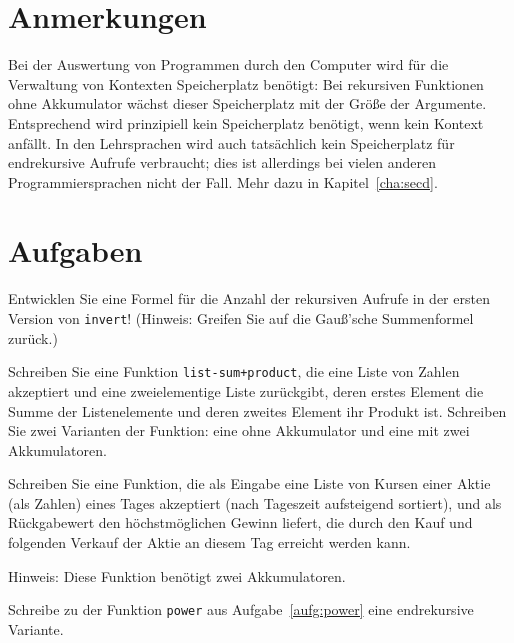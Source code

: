\section*{Anmerkungen}

Bei der Auswertung von Programmen durch den Computer wird für die
Verwaltung von Kontexten Speicherplatz benötigt: Bei rekursiven
Funktionen ohne Akkumulator wächst dieser Speicherplatz mit der Größe
der Argumente.  Entsprechend wird prinzipiell kein Speicherplatz
benötigt, wenn kein Kontext anfällt.  In den Lehrsprachen  wird auch tatsächlich
kein Speicherplatz für endrekursive Aufrufe verbraucht; dies ist
allerdings bei vielen anderen Programmiersprachen nicht der Fall.
Mehr dazu in Kapitel~\ref{cha:secd}.

\section*{Aufgaben}

\begin{aufgabe}
  \label{ref:o-of-invert}
  Entwicklen Sie eine Formel für die Anzahl der rekursiven Aufrufe in
  der ersten Version von \texttt{invert}!  (Hinweis: Greifen Sie auf
  die Gauß'sche Summenformel zurück.)
\end{aufgabe}

\begin{aufgabe}
  Schreiben Sie eine Funktion \texttt{list-sum+product}, die eine
  Liste von Zahlen akzeptiert und eine zweielementige Liste
  zurückgibt, deren erstes Element die Summe der Listenelemente und
  deren zweites Element ihr Produkt ist.  Schreiben Sie zwei Varianten
  der Funktion: eine ohne Akkumulator und eine mit zwei Akkumulatoren.
\end{aufgabe}

\begin{aufgabe}
  Schreiben Sie eine Funktion, die als Eingabe eine Liste von Kursen
  einer Aktie (als Zahlen) eines Tages akzeptiert (nach Tageszeit
  aufsteigend sortiert), und als Rückgabewert den höchstmöglichen
  Gewinn liefert, die durch den Kauf und folgenden Verkauf der Aktie
  an diesem Tag erreicht werden kann.

  Hinweis: Diese Funktion benötigt zwei Akkumulatoren.
\end{aufgabe}

\begin{aufgabe}
  Schreibe zu der Funktion \texttt{power} aus Aufgabe~\ref{aufg:power} eine
  endrekursive Variante.
\end{aufgabe}

